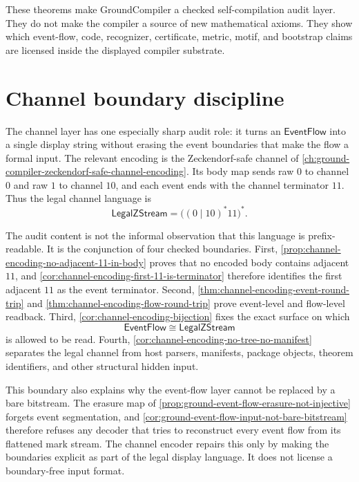 These theorems make GroundCompiler a checked self-compilation audit layer. They
do not make the compiler a source of new mathematical axioms. They show which
event-flow, code, recognizer, certificate, metric, motif, and bootstrap claims
are licensed inside the displayed compiler substrate.

\section{Channel boundary discipline}
\label{sec:bedc-groundcompiler-audit-map-channel-boundary-discipline}

The channel layer has one especially sharp audit role: it turns an
$\mathsf{EventFlow}$ into a single display string without erasing the event
boundaries that make the flow a formal input. The relevant encoding is the
Zeckendorf-safe channel of
\autoref{ch:ground-compiler-zeckendorf-safe-channel-encoding}. Its body map
sends raw $0$ to channel $0$ and raw $1$ to channel $10$, and each event ends
with the channel terminator $11$. Thus the legal channel language is
$$
  \mathsf{LegalZStream}
  =
  \big((0\mid 10)^{*}11\big)^{*}.
$$

The audit content is not the informal observation that this language is
prefix-readable. It is the conjunction of four checked boundaries. First,
\autoref{prop:channel-encoding-no-adjacent-11-in-body} proves that no encoded
body contains adjacent $11$, and
\autoref{cor:channel-encoding-first-11-is-terminator} therefore identifies the
first adjacent $11$ as the event terminator. Second,
\autoref{thm:channel-encoding-event-round-trip} and
\autoref{thm:channel-encoding-flow-round-trip} prove event-level and
flow-level readback. Third, \autoref{cor:channel-encoding-bijection} fixes the
exact surface on which
$$
  \mathsf{EventFlow}\cong\mathsf{LegalZStream}
$$
is allowed to be read. Fourth,
\autoref{cor:channel-encoding-no-tree-no-manifest} separates the legal channel
from host parsers, manifests, package objects, theorem identifiers, and other
structural hidden input.

This boundary also explains why the event-flow layer cannot be replaced by a
bare bitstream. The erasure map of
\autoref{prop:ground-event-flow-erasure-not-injective} forgets event
segmentation, and \autoref{cor:ground-event-flow-input-not-bare-bitstream}
therefore refuses any decoder that tries to reconstruct every event flow from
its flattened mark stream. The channel encoder repairs this only by making
the boundaries explicit as part of the legal display language. It does not
license a boundary-free input format.

